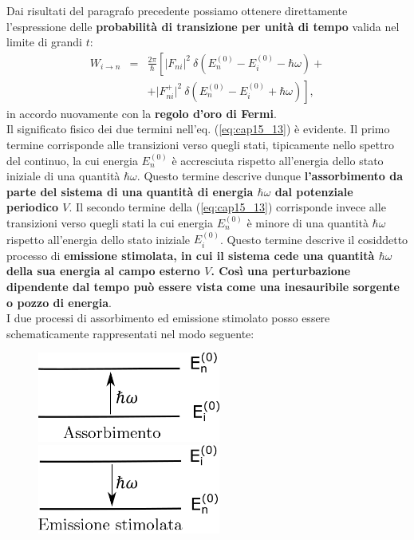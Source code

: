 Dai risultati del paragrafo precedente possiamo ottenere direttamente l'espressione delle \textbf{probabilità di transizione per unità di tempo} valida nel limite di grandi $t$:
\begin{eqnarray}
W_{i\rightarrow n} &=& \frac{2\pi}{\hbar}\left[ \vert F_{ni}\vert ^2 \ \delta (E_n^{(0)}-E_i^{(0)}-\hbar \omega) + \right.\nonumber \\
& &\left. +\vert F_{ni} ^+\vert ^2 \ \delta (E_n^{(0)}-E_i^{(0)}+\hbar \omega)\right],
\label{eq:cap15_13}
\end{eqnarray}
in accordo nuovamente con la \textbf{regolo d'oro di Fermi}.\\
Il significato fisico dei due termini nell'eq. (\ref{eq:cap15_13}) è evidente. Il primo termine corrisponde alle transizioni verso quegli stati, tipicamente nello spettro del continuo, la cui energia $E_n ^{(0)}$ è accresciuta rispetto all'energia dello stato iniziale di una quantità $\hbar \omega$. Questo termine descrive dunque \textbf{l'assorbimento da parte del sistema di una quantità di energia $\hbar \omega$ dal potenziale periodico $V$}. Il secondo termine della (\ref{eq:cap15_13}) corrisponde invece alle transizioni verso quegli stati la cui energia $E_n ^{(0)}$ è minore di una quantità $\hbar \omega$ rispetto all'energia dello stato iniziale $E_i ^{(0)}$. Questo termine descrive il cosiddetto processo di \textbf{emissione stimolata, in cui il sistema cede una quantità $\hbar \omega$ della sua energia al campo esterno $V$. Così una perturbazione dipendente dal tempo può essere vista come una inesauribile sorgente o pozzo di energia}.\\
I due processi di assorbimento ed emissione stimolato posso essere schematicamente rappresentati nel modo seguente:
\begin{figure}[!htbp]
\begin{center}
\includegraphics[width=6cm]{immagini/cap_15/fig_15_2.png}\hspace{1cm}
\includegraphics[width=6cm]{immagini/cap_15/fig_15_3.png}
\end{center}
\end{figure}
\newpage

